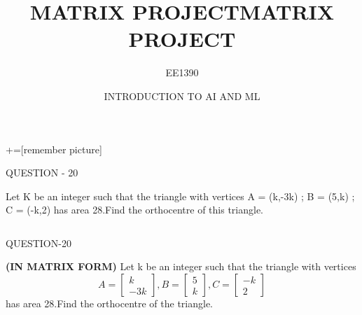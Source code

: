 \documentclass{beamer} %
\title{MATRIX PROJECT}
\title{MATRIX PROJECT}
\institute{}
\author{EE1390}
\date{INTRODUCTION TO AI AND ML}
\begin{document}
+=[remember picture]
\lstset{language=C++}   
\everymath{\displaystyle}

\begin{frame}

	\titlepage
\end{frame}



\begin{frame}{QUESTION - 20 }

Let K be an integer such that the triangle with vertices A = (k,-3k) ; B = (5,k) ; C = (-k,2) has area 28.Find the orthocentre of this triangle.



\begin{columns}




\end{columns}

\end{frame}


\begin{frame}{QUESTION-20}

{\bf (IN MATRIX FORM)}  
Let k be an integer such that the triangle with vertices
\newline
\[
A = \begin{bmatrix}
k \\
-3k
\end{bmatrix},
B = \begin{bmatrix}
5 \\
k \end{bmatrix},
C = \begin{bmatrix}
-k \\
2 \end{bmatrix}\]
\newline
has area 28.Find the orthocentre of the triangle.
\end{frame}
\end{document}
